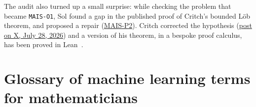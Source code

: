 The audit also turned up a small surprise: while checking the problem that became \texttt{MAIS-O1}, Sol found a gap in the published proof of Critch's bounded L\"ob theorem, and proposed a repair (\href{https://github.com/lionellevine/MAIS/tree/main/papers/P2}{MAIS-P2}). Critch corrected the hypothesis (\href{https://x.com/AndrewCritchPhD/status/2082141000831795467}{post on X, July 28, 2026}) and a version of his theorem, in a bespoke proof calculus, has been proved in Lean~\cite{duclaux2026}.

\appendix

\section{Glossary of machine learning terms for mathematicians}
\label{app:glossary}

